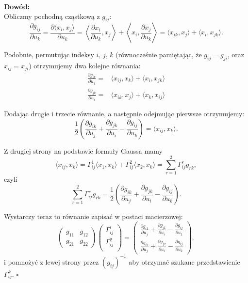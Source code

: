 \begin{frame}

\textcolor{ared}{\textbf{Dowód:}}\\\pause
Obliczmy pochodną cząstkową z $g_{ij}$:
\[\frac{\partial{g_{ij}}}{\partial u_k}=\frac{\partial\langle x_i,x_j \rangle}{\partial u_k}=\left\langle \frac{\partial x_i}{\partial u_k},x_j \right\rangle + \left\langle x_i,\frac{\partial x_j}{\partial u_k}\right\rangle=\langle x_{ik},x_j\rangle+\langle x_i,x_{jk}\rangle.\]


\pause Podobnie, permutując indeksy $i$, $j$, $k$ (równocześnie pamiętając, że $g_{ij}=g_{ji}$, oraz $x_{ij}=x_{ji}$) otrzymujemy dwa kolejne równania:
\begin{align*}
\frac{\partial{g_{ik}}}{\partial u_j}=&\langle x_{ij},x_k\rangle+\langle x_i,x_{jk}\rangle\\
\frac{\partial{g_{jk}}}{\partial u_i}=&\langle x_{ik},x_j\rangle+\langle x_k,x_{ij}\rangle
\end{align*}

\pause Dodając drugie i trzecie równanie, a następnie odejmując pierwsze otrzymujemy:
\[\frac{1}{2}\left(\frac{\partial{g_{ik}}}{\partial u_j}+\frac{\partial{g_{jk}}}{\partial u_i}- \frac{\partial{g_{ij}}}{\partial u_k}\right)=\langle x_{ij},x_{k}\rangle.\]

\end{frame}
\begin{frame}

Z drugiej strony na podstawie formuły Gaussa mamy 
\[\langle x_{ij},x_{k}\rangle=\Gamma^1_{ij}\langle x_1,x_k\rangle+ \Gamma^2_{ij}\langle x_2,x_k\rangle=\sum_{r=1}^2\Gamma^r_{ij}g_{rk},\]
\pause czyli 
\[\sum_{r=1}^2\Gamma^r_{ij}g_{rk}=\frac{1}{2}\left(\frac{\partial{g_{ik}}}{\partial u_j}+\frac{\partial{g_{jk}}}{\partial u_i}- \frac{\partial{g_{ij}}}{\partial u_k}\right).\]


\pause Wystarczy teraz to równanie zapisać w postaci macierzowej:
\[
\left(
\begin{array}{cc}
g_{11} & g_{12}\\
g_{21} & g_{22}
\end{array}
\right) 
\left(
\begin{array}{c}
\Gamma^1_{ij}\\
\Gamma^2_{ij}\\
\end{array}
\right)
=
\left(
\begin{array}{c}
\frac{\partial g_{i1}}{\partial u_j}+\frac{\partial g_{j1}}{\partial u_i}-\frac{\partial g_{ij}}{\partial u_1}\\
\frac{\partial g_{i2}}{\partial u_j}+\frac{\partial g_{j2}}{\partial u_i}-\frac{\partial g_{ij}}{\partial u_2}
\end{array}
\right), 
\]
\pause i pomnożyć z lewej strony przez $(g_{ij})^{-1}$ aby otrzymać szukane przedstawienie $\Gamma^k_{ij}$.
\hfill $\square$

\end{frame}
